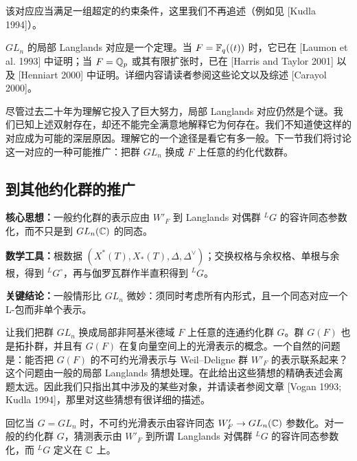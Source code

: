该对应应当满足一组超定的约束条件，这里我们不再追述（例如见 [Kudla 1994]）。

$GL_n$ 的局部 Langlands 对应是一个定理。当 $F=\mathbb{F}_q((t))$ 时，它已在 [Laumon et al. 1993] 中证明；当 $F=\mathbb{Q}_p$ 或其有限扩张时，已在 [Harris and Taylor 2001] 以及 [Henniart 2000] 中证明。详细内容请读者参阅这些论文以及综述 [Carayol 2000]。


尽管过去二十年为理解它投入了巨大努力，局部 Langlands 对应仍然是个谜。我们已知上述双射存在，却还不能完全满意地解释它为何存在。我们不知道使这样的对应成为可能的深层原因。理解它的一个途径是看它有多一般。下一节我们将讨论这一对应的一种可能推广：把群 $GL_n$ 换成 $F$ 上任意的约化代数群。


\subsection{到其他约化群的推广}

\begin{keypoints}
    \item \textbf{核心思想：}一般约化群的表示应由 $W'_F$ 到 Langlands 对偶群 ${}^L G$ 的容许同态参数化，而不只是到 $GL_n(\mathbb{C})$ 的同态。
    \item \textbf{数学工具：}根数据 $(X^*(T),X_*(T),\Delta,\Delta^\vee)$；交换权格与余权格、单根与余根，得到 ${}^L G^\circ$，再与伽罗瓦群作半直积得到 ${}^L G$。
    \item \textbf{关键结论：}一般情形比 $GL_n$ 微妙：须同时考虑所有内形式，且一个同态对应一个 L-包而非单个表示。
\end{keypoints}

让我们把群 $GL_n$ 换成局部非阿基米德域 $F$ 上任意的连通约化群 $G$。群 $G(F)$ 也是拓扑群，并且有 $G(F)$ 在复向量空间上的光滑表示的概念。一个自然的问题是：能否把 $G(F)$ 的不可约光滑表示与 Weil--Deligne 群 $W'_F$ 的表示联系起来？这个问题由一般的局部 Langlands 猜想处理。在此给出这些猜想的精确表述会离题太远。因此我们只指出其中涉及的某些对象，并请读者参阅文章 [Vogan 1993; Kudla 1994]，那里对这些猜想有很详细的描述。

回忆当 $G=GL_n$ 时，不可约光滑表示由容许同态 $W'_F\to GL_n(\mathbb{C})$ 参数化。对一般的约化群 $G$，猜测表示由 $W'_F$ 到所谓 Langlands 对偶群 ${}^L G$ 的容许同态参数化，而 ${}^L G$ 定义在 $\mathbb{C}$ 上。

